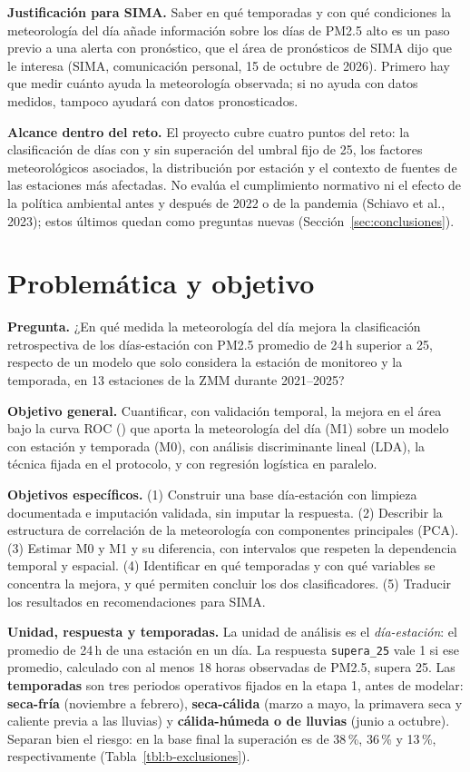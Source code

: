 \textbf{Justificación para SIMA.} Saber en qué temporadas y con qué condiciones la meteorología del día añade información sobre los días de PM2.5 alto es un paso previo a una alerta con pronóstico, que el área de pronósticos de SIMA dijo que le interesa (SIMA, comunicación personal, 15 de octubre de 2026). Primero hay que medir cuánto ayuda la meteorología observada; si no ayuda con datos medidos, tampoco ayudará con datos pronosticados.

\textbf{Alcance dentro del reto.} El proyecto cubre cuatro puntos del reto: la clasificación de días con y sin superación del umbral fijo de 25\ugm, los factores meteorológicos asociados, la distribución por estación y el contexto de fuentes de las estaciones más afectadas. No evalúa el cumplimiento normativo ni el efecto de la política ambiental antes y después de 2022 o de la pandemia (Schiavo et al., 2023); estos últimos quedan como preguntas nuevas (Sección~\ref{sec:conclusiones}).

\section{Problemática y objetivo}\label{sec:objetivo}

\textbf{Pregunta.} ¿En qué medida la meteorología del día mejora la clasificación retrospectiva de los días-estación con PM2.5 promedio de 24\,h superior a 25\ugm, respecto de un modelo que solo considera la estación de monitoreo y la temporada, en 13 estaciones de la ZMM durante 2021–2025?

\textbf{Objetivo general.} Cuantificar, con validación temporal, la mejora en el área bajo la curva ROC (\dauc) que aporta la meteorología del día (M1) sobre un modelo con estación y temporada (M0), con análisis discriminante lineal (LDA), la técnica fijada en el protocolo, y con regresión logística en paralelo.

\textbf{Objetivos específicos.} (1) Construir una base día-estación con limpieza documentada e imputación validada, sin imputar la respuesta. (2) Describir la estructura de correlación de la meteorología con componentes principales (PCA). (3) Estimar M0 y M1 y su diferencia, con intervalos que respeten la dependencia temporal y espacial. (4) Identificar en qué temporadas y con qué variables se concentra la mejora, y qué permiten concluir los dos clasificadores. (5) Traducir los resultados en recomendaciones para SIMA.

\textbf{Unidad, respuesta y temporadas.} La unidad de análisis es el \emph{día-estación}: el promedio de 24\,h de una estación en un día. La respuesta \texttt{supera\_25} vale 1 si ese promedio, calculado con al menos 18 horas observadas de PM2.5, supera 25\ugm. Las \textbf{temporadas} son tres periodos operativos fijados en la etapa 1, antes de modelar: \textbf{seca-fría} (noviembre a febrero), \textbf{seca-cálida} (marzo a mayo, la primavera seca y caliente previa a las lluvias) y \textbf{cálida-húmeda o de lluvias} (junio a octubre). Separan bien el riesgo: en la base final la superación es de 38\,\%, 36\,\% y 13\,\%, respectivamente (Tabla~\ref{tbl:b-exclusiones}).

